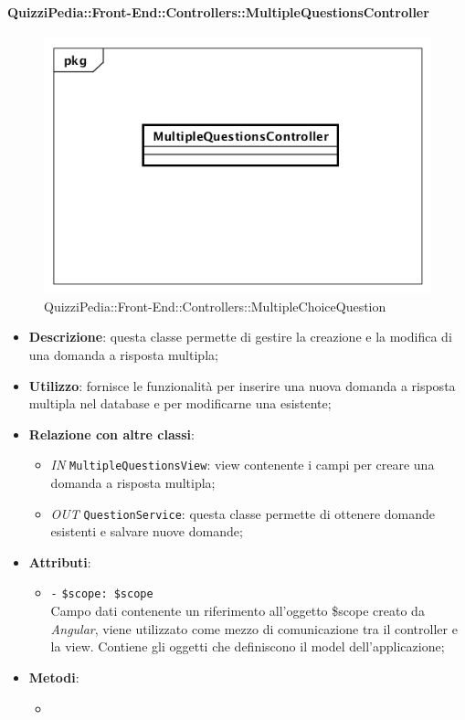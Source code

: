 \paragraph{QuizziPedia::Front-End::Controllers::MultipleQuestionsController}
\begin{figure}
	\centering
	\includegraphics[scale=0.45]{UML/Classi/Front-End/QuizziPedia_Front-end_Controller_MultipleQuestionsController.png}
	\caption{QuizziPedia::Front-End::Controllers::MultipleChoiceQuestion}
\end{figure}
\begin{itemize}
	\item \textbf{Descrizione}: questa classe permette di gestire la creazione e la modifica di una domanda a risposta multipla;
	\item \textbf{Utilizzo}: fornisce le funzionalità per inserire una nuova domanda a risposta multipla nel database e per modificarne una esistente;
	\item \textbf{Relazione con altre classi}:
	\begin{itemize}
		\item \textit{IN} \texttt{MultipleQuestionsView}: view contenente i campi per creare una domanda a risposta multipla;  
		\item \textit{OUT} \texttt{QuestionService}: questa classe permette di ottenere domande esistenti e salvare nuove domande;
	\end{itemize}
	\item \textbf{Attributi}:
	\begin{itemize}
		\item \texttt{-} \texttt{\$scope: \$scope} \\
		Campo dati contenente un riferimento all’oggetto \$scope creato da \textit{Angular}, viene utilizzato come mezzo di comunicazione tra il controller e la view. Contiene gli oggetti che definiscono il model dell’applicazione;
	\end{itemize}
	\item \textbf{Metodi}:
	\begin{itemize}
		\item 
	\end{itemize}
\end{itemize}

